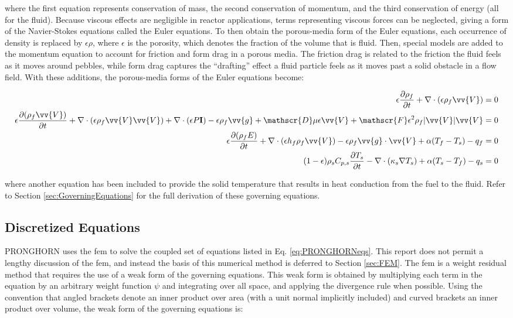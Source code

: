 \documentclass[10pt]{article}
\newcommand{\massconservation}{\epsilon\frac{\partial\rho_f}{\partial t} + \nabla\cdot(\epsilon\rho_f\vv{V})=0} %
\newcommand{\momentumconservation}{\epsilon\frac{\partial(\rho_f\vv{V})}{\partial t}+\nabla\cdot(\epsilon\rho_f\vv{V}\vv{V})+\nabla\cdot(\epsilon P\textbf{I})-\epsilon\rho_f\vv{g}+\mathscr{D}\mu\epsilon\vv{V}+\mathscr{F}\epsilon^2\rho_f|\vv{V}|\vv{V}=0} %
\newcommand{\fluidenergyconservation}{\epsilon\frac{\partial (\rho_f E)}{\partial t}+\nabla\cdot(\epsilon h_f\rho_f\vv{V})-\epsilon\rho_f \vv{g}\cdot\vv{V}+\alpha(T_f-T_s)-q_f=0} %
\newcommand{\solidenergyconservation}{(1-\epsilon)\rho_sC_{p,s}\frac{\partial T_s}{\partial t}-\nabla\cdot(\kappa_s\nabla T_s)+\alpha(T_s-T_f)-q_s=0} %
\numberwithin{equation}{section} %
\begin{document}
where the first equation represents conservation of mass, the second conservation of momentum, and the third conservation of energy (all for the fluid). Because viscous effects are negligible in reactor applications, terms representing viscous forces can be neglected, giving a form of the Navier-Stokes equations called the Euler equations. To then obtain the porous-media form of the Euler equations, each occurrence of density is replaced by \(\epsilon\rho\), where \(\epsilon\) is the porosity, which denotes the fraction of the volume that is fluid. Then, special models are added to the momentum equation to account for friction and form drag in a porous media. The friction drag is related to the friction the fluid feels as it moves around pebbles, while form drag captures the ``drafting'' effect a fluid particle feels as it moves past a solid obstacle in a flow field. With these additions, the porous-media forms of the Euler equations become:

\begin{equation}
\label{eq:PRONGHORNeqs}
\begin{aligned}
\massconservation\\
\momentumconservation\\
\fluidenergyconservation\\
\solidenergyconservation\\
\end{aligned}
\end{equation}

where another equation has been included to provide the solid temperature that results in heat conduction from the fuel to the fluid. Refer to Section \ref{sec:GoverningEquations} for the full derivation of these governing equations.

\subsection{Discretized Equations}

PRONGHORN uses the \gls{fem} to solve the coupled set of equations listed in Eq. \eqref{eq:PRONGHORNeqs}. This report does not permit a lengthy discussion of the \gls{fem}, and instead the basis of this numerical method is deferred to Section \ref{sec:FEM}. The \gls{fem} is a weight residual method that requires the use of a weak form of the governing equations. This weak form is obtained by multiplying each term in the equation by an arbitrary weight function \(\psi\) and integrating over all space, and applying the divergence rule when possible. Using the convention that angled brackets denote an inner product over area (with a unit normal implicitly included) and curved brackets an inner product over volume, the weak form of the governing equations is:
\end{document}
